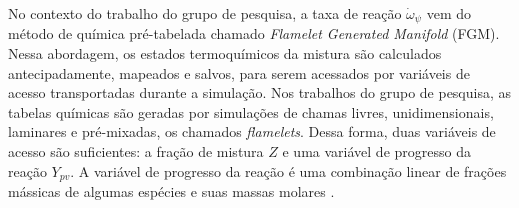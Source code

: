 No contexto do trabalho do grupo de pesquisa, a taxa de reação $\dot \omega_\psi$ vem do método de química pré-tabelada chamado \emph{Flamelet Generated Manifold} (FGM).
Nessa abordagem, os estados termoquímicos da mistura são calculados antecipadamente, mapeados e salvos, para serem acessados por variáveis de acesso transportadas durante a simulação.
Nos trabalhos do grupo de pesquisa, as tabelas químicas são geradas por simulações de chamas livres, unidimensionais, laminares e pré-mixadas, os chamados \emph{flamelets}.
Dessa forma, duas variáveis de acesso são suficientes: a fração de mistura $Z$ e uma variável de progresso da reação $Y_{pv}$.
A variável de progresso da reação é uma combinação linear de frações mássicas de algumas espécies e suas massas molares \cite{SacomanoF2018CTM}.











